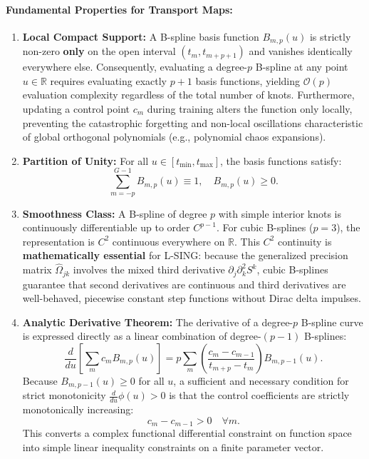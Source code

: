 \documentclass[11pt,a4paper]{article}
\theoremstyle{plain}
\theoremstyle{definition}
\theoremstyle{remark}
\begin{document}
\paragraph{Fundamental Properties for Transport Maps:}
\begin{enumerate}
    \item \textbf{Local Compact Support:} A B-spline basis function $B_{m, p}(u)$ is strictly non-zero \textbf{only} on the open interval $(t_m, t_{m+p+1})$ and vanishes identically everywhere else. Consequently, evaluating a degree-$p$ B-spline at any point $u \in \mathbb{R}$ requires evaluating exactly $p+1$ basis functions, yielding $\mathcal{O}(p)$ evaluation complexity regardless of the total number of knots. Furthermore, updating a control point $c_m$ during training alters the function only locally, preventing the catastrophic forgetting and non-local oscillations characteristic of global orthogonal polynomials (e.g., polynomial chaos expansions).
    \item \textbf{Partition of Unity:} For all $u \in [t_{\min}, t_{\max}]$, the basis functions satisfy:
    \begin{equation}
        \sum_{m=-p}^{G-1} B_{m, p}(u) \equiv 1, \quad B_{m, p}(u) \ge 0.
    \end{equation}
    \item \textbf{Smoothness Class:} A B-spline of degree $p$ with simple interior knots is continuously differentiable up to order $C^{p-1}$. For cubic B-splines ($p = 3$), the representation is $C^2$ continuous everywhere on $\mathbb{R}$. This $C^2$ continuity is \textbf{mathematically essential} for L-SING: because the generalized precision matrix $\hat{\Omega}_{jk}$ involves the mixed third derivative $\partial_j \partial_k^2 S^k$, cubic B-splines guarantee that second derivatives are continuous and third derivatives are well-behaved, piecewise constant step functions without Dirac delta impulses.
    \item \textbf{Analytic Derivative Theorem:} The derivative of a degree-$p$ B-spline curve is expressed directly as a linear combination of degree-$(p-1)$ B-splines:
    \begin{equation}
        \frac{d}{du} \left[ \sum_{m} c_m B_{m, p}(u) \right] = p \sum_{m} \left( \frac{c_m - c_{m-1}}{t_{m+p} - t_m} \right) B_{m, p-1}(u).
        \label{eq:bspline_deriv_recurrence}
    \end{equation}
    Because $B_{m, p-1}(u) \ge 0$ for all $u$, a sufficient and necessary condition for strict monotonicity $\frac{d}{du} \phi(u) > 0$ is that the control coefficients are strictly monotonically increasing:
    \begin{equation}
        c_m - c_{m-1} > 0 \quad \forall m.
    \end{equation}
    This converts a complex functional differential constraint on function space into simple linear inequality constraints on a finite parameter vector.
\end{enumerate}
\end{document}
